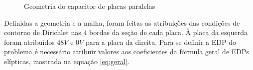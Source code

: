 \documentclass[
    12pt,               %
    openright,          %
    oneside,
    a4paper,            %
    english,            %
    french,             %
    spanish,            %
    brazil              %
    ]{abntex2}
\begin{document}
\begin{figure}
	\qquad	
	\qquad
	\caption{Geometria do capacitor de placas paralelas}%
	\label{fig:mesh}%
\end{figure}

Definidas a geometria e a malha, foram feitas as atribuições das condições de contorno de Dirichlet nas $4$ bordas da seção de cada placa. À placa da esquerda foram atribuídos $48V$ e $0V$ para a placa da direita. Para se definir a EDP do problema é necessário atribuir valores aos coeficientes da fórmula geral de EDPs elípticas, mostrada na equação \ref{eq:geral}.
\end{document}

